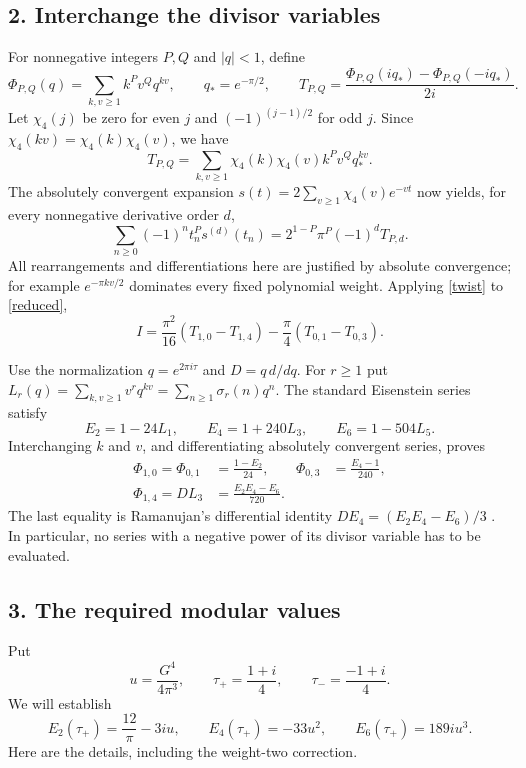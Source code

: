 \documentclass[11pt]{article}
\begin{document}
\subsection*{2. Interchange the divisor variables}
For nonnegative integers $P,Q$ and $|q|<1$, define
\[
 \Phi_{P,Q}(q)=\sum_{k,v\ge1}k^P v^Q q^{kv},\qquad
 q_*=e^{-\pi/2},\qquad
 T_{P,Q}=\frac{\Phi_{P,Q}(iq_*)-\Phi_{P,Q}(-iq_*)}{2i}.
\]
Let $\chi_4(j)$ be zero for even $j$ and $(-1)^{(j-1)/2}$ for odd
$j$. Since $\chi_4(kv)=\chi_4(k)\chi_4(v)$, we have
\[
 T_{P,Q}=\sum_{k,v\ge1}\chi_4(k)\chi_4(v)k^Pv^Qq_*^{kv}.
\]
The absolutely convergent expansion
$s(t)=2\sum_{v\ge1}\chi_4(v)e^{-vt}$ now yields, for every
nonnegative derivative order $d$,
\begin{equation}\label{twist}
 \sum_{n\ge0}(-1)^nt_n^P s^{(d)}(t_n)
       =2^{1-P}\pi^P(-1)^d T_{P,d}.
\end{equation}
All rearrangements and differentiations here are justified by
absolute convergence; for example $e^{-\pi kv/2}$ dominates every
fixed polynomial weight. Applying \eqref{twist} to \eqref{reduced},
\begin{equation}\label{four-sums}
 I=\frac{\pi^2}{16}(T_{1,0}-T_{1,4})
                   -\frac{\pi}{4}(T_{0,1}-T_{0,3}).
\end{equation}

Use the normalization $q=e^{2\pi i\tau}$ and $D=q\,d/dq$.
For $r\ge1$ put
$L_r(q)=\sum_{k,v\ge1}v^r q^{kv}=\sum_{n\ge1}\sigma_r(n)q^n$.
The standard Eisenstein series satisfy
\[
 E_2=1-24L_1,\qquad E_4=1+240L_3,\qquad E_6=1-504L_5.
\]
Interchanging $k$ and $v$, and differentiating absolutely convergent
series, proves
\begin{align}
 \Phi_{1,0}=\Phi_{0,1}&=\frac{1-E_2}{24},
 &\Phi_{0,3}&=\frac{E_4-1}{240},\label{Phi}\\
 \Phi_{1,4}=DL_3&=\frac{E_2E_4-E_6}{720}.
 &&\label{Phi14}
\end{align}
The last equality is Ramanujan's differential identity
$DE_4=(E_2E_4-E_6)/3$ \cite[Section 5.1]{Z}.
In particular, no series with a negative power of its divisor
variable has to be evaluated.

\subsection*{3. The required modular values}
Put
\[
 u=\frac{G^4}{4\pi^3},\qquad \tau_+=\frac{1+i}{4},\qquad
 \tau_- =\frac{-1+i}{4}.
\]
We will establish
\begin{equation}\label{cm}
 E_2(\tau_+)=\frac{12}{\pi}-3iu,\qquad
 E_4(\tau_+)=-33u^2,\qquad E_6(\tau_+)=189iu^3.
\end{equation}
Here are the details, including the weight-two correction.
\end{document}
